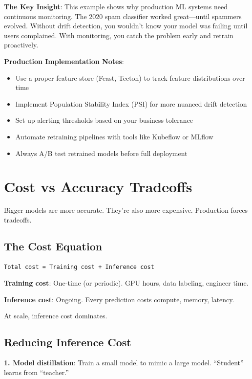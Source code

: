 \textbf{The Key Insight}: This example shows why production ML systems need continuous monitoring. The 2020 spam classifier worked great---until spammers evolved. Without drift detection, you wouldn't know your model was failing until users complained. With monitoring, you catch the problem early and retrain proactively.

\textbf{Production Implementation Notes}:
\begin{itemize}
\item Use a proper feature store (Feast, Tecton) to track feature distributions over time
\item Implement Population Stability Index (PSI) for more nuanced drift detection
\item Set up alerting thresholds based on your business tolerance
\item Automate retraining pipelines with tools like Kubeflow or MLflow
\item Always A/B test retrained models before full deployment
\end{itemize}

\section{Cost vs Accuracy Tradeoffs}

Bigger models are more accurate. They're also more expensive. Production forces tradeoffs.

\subsection{The Cost Equation}

\begin{lstlisting}
Total cost = Training cost + Inference cost
\end{lstlisting}

\textbf{Training cost}: One-time (or periodic). GPU hours, data labeling, engineer time.

\textbf{Inference cost}: Ongoing. Every prediction costs compute, memory, latency.

At scale, inference cost dominates.

\subsection{Reducing Inference Cost}

\textbf{1. Model distillation}: Train a small model to mimic a large model. ``Student'' learns from ``teacher.''

